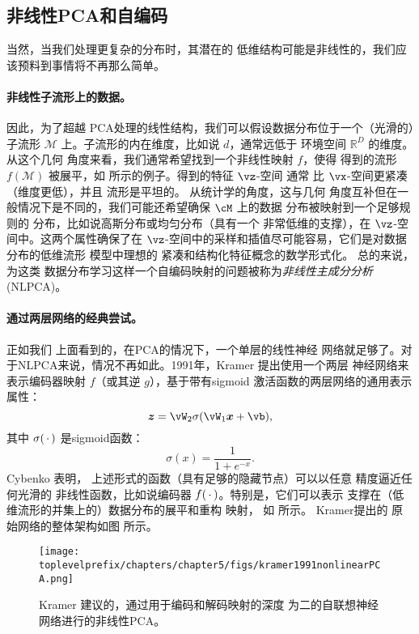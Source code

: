 \documentclass[../../book-main_zh.tex]{subfiles}
\begin{document}
\subsection{非线性PCA和自编码}\label{sub:nonlinear-pca}\label{sec:NLPCA}
当然，当我们处理更复杂的分布时，其潜在的
低维结构可能是非线性的，我们应该预料到事情将不再那么简单。

\paragraph{非线性子流形上的数据。} 因此，为了超越
PCA处理的线性结构，我们可以假设数据分布位于一个（光滑的）子流形 $\mathcal{M}$ 上。子流形的内在维度，比如说 $d$，通常远低于
环境空间 $\mathbb{R}^D$ 的维度。从这个几何
角度来看，我们通常希望找到一个非线性映射 $f$，使得
得到的流形
$f(\mathcal{M})$ 被展平，如  所示的例子。得到的特征 $\vz$-空间
通常
比 $\vx$-空间更紧凑（维度更低），并且
流形是平坦的。
从统计学的角度，这与几何
角度互补但在一般情况下是不同的，我们可能还希望确保 $\cM$ 上的数据
分布被映射到一个足够规则的
分布，比如说高斯分布或均匀分布（具有一个
非常低维的支撑），在 $\vz$-空间中。这两个属性确保了在 $\vz$-空间中的采样和插值尽可能容易，它们是对数据分布的低维流形
模型中理想的
紧凑和结构化特征概念的数学形式化。
总的来说，为这类
数据分布学习这样一个自编码映射的问题被称为{\em 非线性主成分分析}
(NLPCA)。

\paragraph{通过两层网络的经典尝试。} 正如我们
上面看到的，在PCA的情况下，一个单层的线性神经
网络就足够了。对于NLPCA来说，情况不再如此。1991年，Kramer
\cite{Kramer1991NonlinearPC} 提出使用一个两层
神经网络来表示编码器映射 $f$（或其逆 $g$），基于带有sigmoid
激活函数的两层网络的通用表示属性：
\begin{equation}
  \z = \vW_2 \sigma(\vW_1\x +\vb),
\end{equation}
其中 $\sigma(\,\cdot\,)$ 是sigmoid函数：
\begin{equation}
  \sigma(x) = \frac{1}{1+ e^{-x}}.
\end{equation}
Cybenko \cite{Cybenko1989ApproximationBS} 表明，
上述形式的函数（具有足够的隐藏节点）可以以任意
精度逼近任何光滑的
非线性函数，比如说编码器 $f(\,\cdot\,)$。特别是，它们可以表示
支撑在（低维流形的并集上的）数据分布的展平和重构
映射，
如  所示。
Kramer提出的
原始网络的整体架构如图  所示。
\begin{figure}[tb]
  \centering
  \texttt{[image: \\toplevelprefix/chapters/chapter5/figs/kramer1991nonlinearPCA.png]}
  \caption{Kramer \cite{Kramer1991NonlinearPC} 建议的，通过用于编码和解码映射的深度
    为二的自联想神经网络进行的非线性PCA。}
  \label{fig:NLPCA}
\end{figure}
\end{document}
